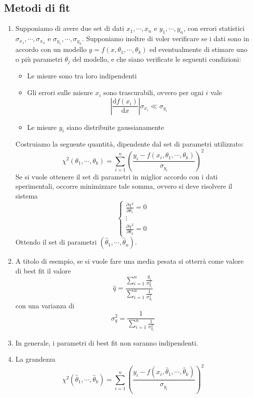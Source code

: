 \documentclass[a4paper,11pt]{article}
\begin{document}
\subsection{Metodi di fit}
\begin{enumerate}[resume]
	\item Supponiamo di avere due set di dati $x_1,\cdots,x_n$ e $y_1,\cdots,y_n$, con errori statistici $\sigma_{x_1},\cdots,\sigma_{x_n}$ e $\sigma_{y_1},\cdots,\sigma_{y_n}$. Supponiamo inoltre di voler verificare se i dati sono in accordo con un modello $y=f(x,\theta_1,\cdots,\theta_k)$ ed eventualmente di stimare uno o più parametri $\theta_j$ del modello, e che siano verificate le seguenti condizioni:
	\begin{itemize}
		\item Le misure sono tra loro indipendenti
		\item Gli errori sulle misure $x_i$ sono trascurabili, ovvero per ogni $i$ vale
		\[\left|\frac{\mathrm{d}f(x_i)}{\mathrm{d}x}\right|\sigma_{x_i}\ll\sigma_{y_i}\]
		\item Le misure $y_i$ siano distribuite gaussianamente
	\end{itemize}
	Costruiamo la seguente quantità, dipendente dal set di parametri utilizzato:
	\[\chi^2\left(\theta_1,\cdots,\theta_k\right)=\sum_{i=1}^{n}\left(\frac{y_i-f(x_i,\theta_1,\cdots,\theta_k)}{\sigma_{y_i}}\right)^2\]
	Se si vuole ottenere il set di parametri in miglior accordo con i dati sperimentali, occorre minimizzare tale somma, ovvero si deve risolvere il sistema
	\[\left\{\begin{array}{l}
	\frac{\partial\chi^2}{\partial\theta_1}=0\\
	\vdots\\
	\frac{\partial\chi^2}{\partial\theta_k}=0
	\end{array}\right.\]
	Ottendo il set di parametri $(\hat{\theta}_1,\cdots,\hat{\theta}_n)$.
	\item A titolo di esempio, se si vuole fare una media pesata si otterrà come valore di best fit il valore
	\[\hat{q}=\frac{\sum_{i=1}^{n}\frac{y_i}{\sigma^2_{y_i}}}{\sum_{i=1}^{n}\frac{1}{\sigma^2_{y_i}}}\]
	con una varianza di 
	\[\sigma^2_q=\frac{1}{\sum_{i=1}^{n}\frac{1}{\sigma^2_{y_i}}}\]
	\item In generale, i parametri di best fit non saranno indipendenti.
	\item La grandezza
	\[\chi^2\left(\hat{\theta}_1,\cdots,\hat{\theta}_k\right)=\sum_{i=1}^{n}\left(\frac{y_i-f(x_i,\hat\theta_1,\cdots,\hat\theta_k)}{\sigma_{y_i}}\right)^2\]	

\end{enumerate}
\end{document}
